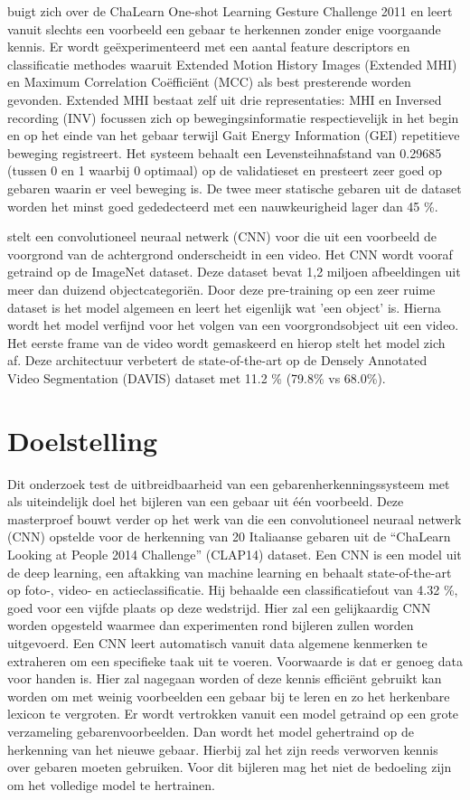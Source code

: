 \npar \cite{oneshot-gesture-rgbd} buigt zich over de ChaLearn One-shot Learning Gesture Challenge 2011 en leert vanuit slechts een voorbeeld een gebaar te herkennen zonder enige voorgaande kennis. Er wordt ge\"experimenteerd met een aantal feature descriptors en classificatie methodes waaruit Extended Motion History Images (Extended MHI) en Maximum Correlation Co\"effici\"ent (MCC) als best presterende worden gevonden. Extended MHI  bestaat zelf uit drie representaties: MHI en Inversed recording (INV) focussen zich op bewegingsinformatie respectievelijk in het begin en op het einde van het gebaar terwijl Gait Energy Information (GEI) repetitieve beweging registreert. Het systeem behaalt een Levensteihnafstand van 0.29685 (tussen 0 en 1 waarbij 0 optimaal) op de validatieset en presteert zeer goed op gebaren waarin er veel beweging is. De twee meer statische gebaren uit de dataset worden het minst goed gededecteerd met een nauwkeurigheid lager dan 45 \%.

\npar \cite{oneshot-video-segm} stelt een convolutioneel neuraal netwerk (CNN) voor die uit een voorbeeld de voorgrond van de achtergrond onderscheidt in een video. Het CNN wordt vooraf getraind op de ImageNet dataset. Deze dataset bevat 1,2 miljoen afbeeldingen uit meer dan duizend objectcategori\"en. Door deze pre-training op een zeer ruime dataset is het model algemeen en leert het eigenlijk wat 'een object' is. Hierna wordt het model verfijnd voor het volgen van een voorgrondsobject uit een video. Het eerste frame van de video wordt gemaskeerd en hierop stelt het model zich af. Deze architectuur verbetert de state-of-the-art op de Densely Annotated Video Segmentation (DAVIS) dataset met 11.2 \% (79.8\% vs 68.0\%).

\section{Doelstelling}
Dit onderzoek test de uitbreidbaarheid van een gebarenherkenningssysteem met als uiteindelijk doel het bijleren van een gebaar uit \'e\'en voorbeeld.
\npar Deze masterproef bouwt verder op het werk van \cite{lionel} die een convolutioneel neuraal netwerk (CNN) opstelde voor de herkenning van 20 Italiaanse gebaren uit de ``ChaLearn Looking at People 2014 Challenge'' (CLAP14) dataset. Een CNN is een model uit de deep learning, een aftakking van machine learning en behaalt state-of-the-art op foto-, video- en actieclassificatie.  Hij behaalde een classificatiefout van 4.32 \%, goed voor een vijfde plaats op deze wedstrijd. Hier zal een gelijkaardig CNN worden opgesteld waarmee dan experimenten rond bijleren zullen worden uitgevoerd.
\npar Een CNN leert automatisch vanuit data algemene kenmerken te extraheren om een specifieke taak uit te voeren. Voorwaarde is dat er genoeg data voor handen is. Hier zal nagegaan worden of deze kennis effici\"ent gebruikt kan worden om met weinig voorbeelden een gebaar bij te leren en zo het herkenbare lexicon te vergroten. Er wordt vertrokken vanuit een model getraind op een grote verzameling gebarenvoorbeelden. Dan wordt het model gehertraind op de herkenning van het nieuwe gebaar. Hierbij zal het zijn reeds verworven kennis over gebaren moeten gebruiken. Voor dit bijleren mag het niet de bedoeling zijn om het volledige model te hertrainen.

